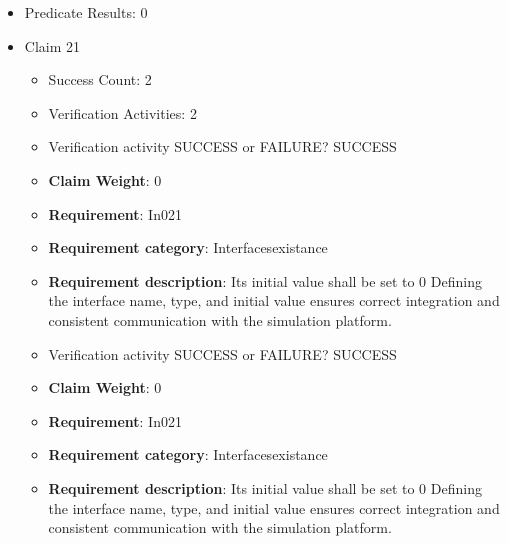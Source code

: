 \documentclass{article}
\begin{document}
\begin{itemize}
\begin{itemize}
					\item Verification activity SUCCESS or FAILURE? SUCCESS
					\item \textbf{Claim Weight}: 0
						\item \textbf{Requirement}: In020 
						\item \textbf{Requirement category}: Interfacesexistance 
						\item \textbf{Requirement description}: Its initial value shall be set to 0 Defining the interface name, type, and initial value ensures correct integration and consistent communication with the simulation platform.
					
				\end{itemize}
				
									    
				\item Predicate Results: 0

  				  \item Claim 21
				\begin{itemize}
			    	\item Success Count: 2 
			    	\item Verification Activities: 2
					\item Verification activity SUCCESS or FAILURE? SUCCESS
					\item \textbf{Claim Weight}: 0
						\item \textbf{Requirement}: In021 
						\item \textbf{Requirement category}: Interfacesexistance 
						\item \textbf{Requirement description}: Its initial value shall be set to 0 Defining the interface name, type, and initial value ensures correct integration and consistent communication with the simulation platform.
					
					\item Verification activity SUCCESS or FAILURE? SUCCESS
					\item \textbf{Claim Weight}: 0
						\item \textbf{Requirement}: In021 
						\item \textbf{Requirement category}: Interfacesexistance 
						\item \textbf{Requirement description}: Its initial value shall be set to 0 Defining the interface name, type, and initial value ensures correct integration and consistent communication with the simulation platform.
					
				\end{itemize}
				

\end{itemize}
\end{document}

